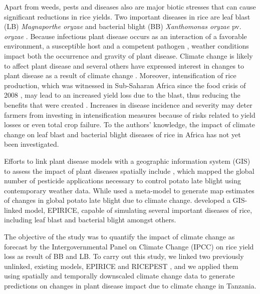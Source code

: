 \documentclass[preprint,review,12pt]{elsarticle}
\begin{document}
    Apart from weeds, pests and diseases also are major biotic stresses that can cause significant reductions in rice yields. Two important diseases in rice are leaf blast (LB) \textit{Magnaporthe oryzae} and bacterial blight (BB) \textit{Xanthomonas oryzae} pv. \textit{oryzae} \cite{Verdier2012}. Because infectious plant disease occurs as an interaction of a favorable environment, a susceptible host and a competent pathogen \cite{Madden2007}, weather conditions impact both the occurrence and gravity of plant disease. Climate change is likely to affect plant disease \cite{Anderson2004, Coakley1999, Garrett2006} and several others have expressed interest in changes to plant disease as a result of climate change \cite{Chakraborty2011, Juroszek2011, Luck2011, Pautasso2010, Savary2011, Sutherst2011}. Moreover, intensification of rice production, which was witnessed in Sub-Saharan Africa since the food crisis of 2008 \cite{Saito2013}, may lead to an increased yield loss due to the blast, thus reducing the benefits that were created \cite{Sere2013}. Increases in disease incidence and severity may deter farmers from investing in intensification measures because of risks related to yield losses or even total crop failure. To the authors' knowledge, the impact of climate change on leaf blast and bacterial blight diseases of rice in Africa has not yet been investigated.
    
    Efforts to link plant disease models with a geographic information system (GIS) to assess the impact of plant diseases spatially include  \citet{Hijmans2000}, which mapped the global number of pesticide applications necessary to control potato late blight using contemporary weather data. While \citet{Sparks2014} used a meta-model to generate map estimates of changes in global potato late blight due to climate change. \citet{Savary2012} developed a GIS-linked model, EPIRICE, capable of simulating several important diseases of rice, including leaf blast and bacterial blight amongst others.
    
    The objective of the study was to quantify the impact of climate change as forecast by the Intergovernmental Panel on Climate Change (IPCC) on rice yield loss as result of BB and LB. To carry out this study, we linked two previously unlinked, existing models, EPIRICE and RICEPEST \cite{Willocquet2000, Willocquet2002}, and we applied them using spatially and temporally downscaled climate change data to generate predictions on changes in plant disease impact due to climate change in Tanzania.
    
\end{document}
